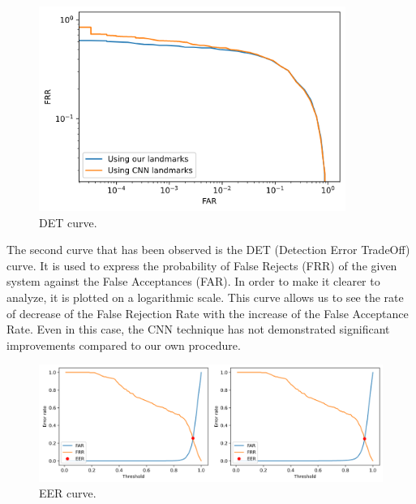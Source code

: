 \documentclass{article}
\begin{document}
\begin{figure}[H]
    \label{fig:det}
    \begin{center}
        \includegraphics[width=10cm,keepaspectratio]{images/det_updated.png}
        \caption{DET curve.}
    \end{center}
\end{figure}

The second curve that has been observed is the DET (Detection Error TradeOff) curve. It is 
used to express the probability of False Rejects (FRR) of the given system against
the False Acceptances (FAR). In order to make it clearer to analyze, it is plotted on a 
logarithmic scale. This curve allows us to see the rate of decrease of the False Rejection
Rate with the increase of the False Acceptance Rate. Even in this case, the CNN technique
has not demonstrated significant improvements compared to our own procedure.

\begin{figure}[H]
    \label{fig:eer}
    \begin{center}
        \includegraphics[width=16cm,keepaspectratio]{images/eer_comparison.png}
        \caption{EER curve.}
    \end{center}
\end{figure}
\end{document}
